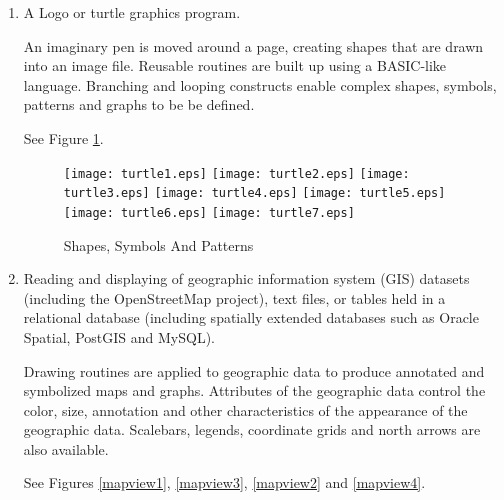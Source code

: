 \begin{enumerate}
\item

A Logo or turtle graphics program.

An imaginary pen is moved around a page,
creating shapes that are drawn into an image file.
Reusable routines are built up using a BASIC-like language.
Branching and looping constructs enable complex shapes, symbols, patterns
and graphs to be be defined.

See Figure \ref{turtle}.

\begin{figure}[htb]
\texttt{[image: turtle1.eps]}
\texttt{[image: turtle2.eps]}
\texttt{[image: turtle3.eps]}
\texttt{[image: turtle4.eps]}
\texttt{[image: turtle5.eps]}
\texttt{[image: turtle6.eps]}
\texttt{[image: turtle7.eps]}
\caption{Shapes, Symbols And Patterns}
\label{turtle}
\end{figure}

\item

Reading and displaying of geographic information
system (GIS) datasets (including the OpenStreetMap project),
text files, or tables held in a relational database
(including spatially extended databases such as Oracle Spatial,
PostGIS and MySQL).

Drawing routines are applied to geographic data to produce annotated and
symbolized maps and graphs.  Attributes of the geographic data control
the color, size, annotation and other characteristics of the
appearance of the geographic data.
Scalebars, legends, coordinate grids and north arrows are also available.

See Figures \ref{mapview1}, \ref{mapview3}, \ref{mapview2} and
\ref{mapview4}.


\end{enumerate}
